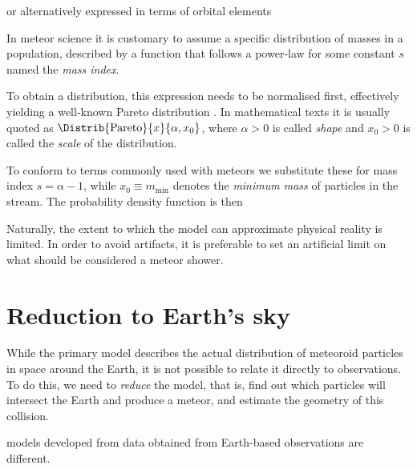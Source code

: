     or alternatively expressed in terms of orbital elements

    In meteor science it is customary to assume a specific distribution of masses in a population,
    described by a function that follows a power-law
    for some constant $s$ named the \emph{mass index}.

    To obtain a distribution, this expression needs to be normalised first,
    effectively yielding a well-known Pareto distribution \citep{arnold1983}.
    In mathematical texts it is usually quoted as $\Distrib{\mathrm{Pareto}}{x}{\alpha, x_0}$,
    where $\alpha > 0$ is called \emph{shape} and $x_0 > 0$ is called the \emph{scale} of the distribution.

    To conform to terms commonly used with meteors we substitute these for mass index
    $s = \alpha - 1$, while $x_0 \equiv m_\mathrm{min}$ denotes the \emph{minimum mass} of particles in the stream.
    The probability density function is then 

    Naturally, the extent to which the model can approximate physical reality is limited.
    In order to avoid artifacts, it is preferable to set an artificial limit on what should be considered
    a meteor shower.




\section{Reduction to Earth's sky} \label{ir}
    While the primary model describes the actual distribution of meteoroid particles in space around the Earth,
    it is not possible to relate it directly to observations. To do this, we need to \emph{reduce} the model,
    that is, find out which particles will intersect the Earth and produce a meteor, and estimate the geometry of this collision.


    models developed from data obtained from Earth-based observations are different.







